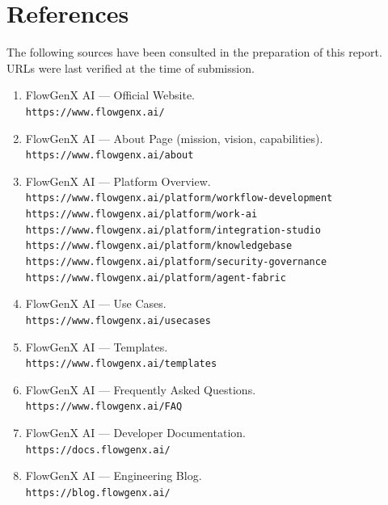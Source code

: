 \chapter*{References}

The following sources have been consulted in the preparation of this
report. URLs were last verified at the time of submission.

\begin{enumerate}[leftmargin=*]
    \item FlowGenX AI --- Official Website. \\
    \texttt{https://www.flowgenx.ai/}

    \item FlowGenX AI --- About Page (mission, vision, capabilities). \\
    \texttt{https://www.flowgenx.ai/about}

    \item FlowGenX AI --- Platform Overview. \\
    \texttt{https://www.flowgenx.ai/platform/workflow-development} \\
    \texttt{https://www.flowgenx.ai/platform/work-ai} \\
    \texttt{https://www.flowgenx.ai/platform/integration-studio} \\
    \texttt{https://www.flowgenx.ai/platform/knowledgebase} \\
    \texttt{https://www.flowgenx.ai/platform/security-governance} \\
    \texttt{https://www.flowgenx.ai/platform/agent-fabric}

    \item FlowGenX AI --- Use Cases. \\
    \texttt{https://www.flowgenx.ai/usecases}

    \item FlowGenX AI --- Templates. \\
    \texttt{https://www.flowgenx.ai/templates}

    \item FlowGenX AI --- Frequently Asked Questions. \\
    \texttt{https://www.flowgenx.ai/FAQ}

    \item FlowGenX AI --- Developer Documentation. \\
    \texttt{https://docs.flowgenx.ai/}

    \item FlowGenX AI --- Engineering Blog. \\
    \texttt{https://blog.flowgenx.ai/}


\end{enumerate}
